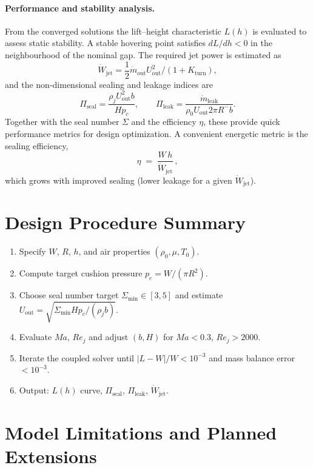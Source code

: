 \documentclass[11pt,a4paper]{article}
\begin{document}
\paragraph{Performance and stability analysis.}
From the converged solutions the lift–height characteristic $L(h)$ is evaluated to assess static stability.
A stable hovering point satisfies $dL/dh < 0$ in the neighbourhood of the nominal gap.
The required jet power is estimated as
\[
  \dot W_{\mathrm{jet}} = \frac{1}{2}\dot m_{\mathrm{out}} U_{\mathrm{out}}^2 /(1+K_{\mathrm{turn}}),
\]
and the non-dimensional sealing and leakage indices are
\[
  \Pi_{\mathrm{seal}} = \frac{\rho_j U_{\mathrm{out}}^2 b}{H p_c},
  \qquad
  \Pi_{\mathrm{leak}} = \frac{\dot m_{\mathrm{leak}}}{\rho_0 U_{\mathrm{out}} 2\pi R^{-} b}.
\]
Together with the seal number $\Sigma$ and the efficiency $\eta$, these provide quick performance metrics for design optimization.
A convenient energetic metric is the sealing efficiency,
\[
  \eta \;=\; \frac{W\,h}{\dot W_{\mathrm{jet}}}\,,
\]
which grows with improved sealing (lower leakage for a given $\dot W_{\mathrm{jet}}$).


\section*{Design Procedure Summary}
\begin{enumerate}
  \item Specify $W$, $R$, $h$, and air properties $(\rho_0,\mu,T_0)$.
  \item Compute target cushion pressure $p_c = W/(\pi R^2)$.
  \item Choose seal number target $\Sigma_{\min}\!\in[3,5]$ and estimate
      $U_{\mathrm{out}}=\sqrt{\Sigma_{\min} H p_c / (\rho_j b)}$.
  \item Evaluate $Ma$, $Re_j$ and adjust $(b,H)$ for $Ma<0.3$, $Re_j>2000$.
  \item Iterate the coupled solver until $|L-W|/W<10^{-3}$ and mass balance error $<10^{-3}$.
  \item Output: $L(h)$ curve, $\Pi_{\mathrm{seal}}$, $\Pi_{\mathrm{leak}}$, $\dot W_{\mathrm{jet}}$.
\end{enumerate}

\section{Model Limitations and Planned Extensions}
\label{sec:model-limitations-and-planned-extensions}
\end{document}
